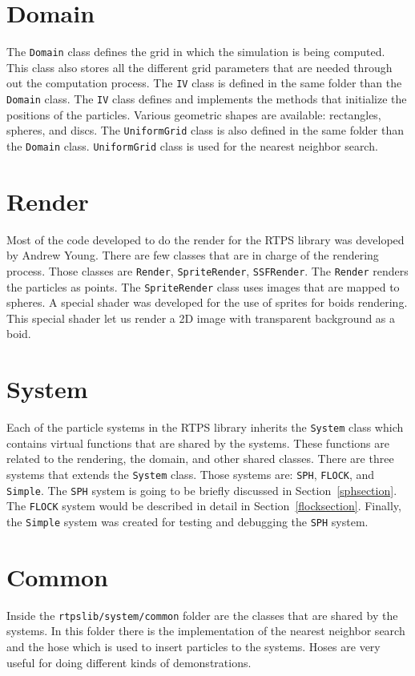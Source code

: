 \section{Domain}
The \texttt{Domain} class defines the grid in which the simulation is being computed. This class also stores all the different grid parameters that are needed through out the computation process. The \texttt{IV} class is defined in the same folder than the \texttt{Domain} class. The \texttt{IV} class defines and implements the methods that initialize the positions of the particles. Various geometric shapes are available: rectangles, spheres, and discs. The \texttt{UniformGrid} class is also defined in the same folder than the \texttt{Domain} class. \texttt{UniformGrid} class is used for the nearest neighbor search.

\section{Render}
Most of the code developed to do the render for the RTPS library was developed by Andrew Young\cite{andrewBlog}. There are few classes that are in charge of the rendering process. Those classes are \texttt{Render}, \texttt{SpriteRender}, \texttt{SSFRender}. The \texttt{Render} renders the particles as points. The \texttt{SpriteRender} class uses images that are mapped to spheres. A special shader was developed for the use of sprites for boids rendering. This special shader let us render a 2D image with transparent background as a boid.

\section{System}
Each of the particle systems in the RTPS library inherits the \texttt{System} class which contains virtual functions that are shared by the systems. These functions are related to the rendering,  the domain, and other shared classes. There are three systems that extends the \texttt{System} class. Those systems are: \texttt{SPH}, \texttt{FLOCK}, and \texttt{Simple}. The \texttt{SPH} system is going to be briefly discussed in Section~\ref{sphsection}. The \texttt{FLOCK} system would be described in detail in Section~\ref{flocksection}. Finally, the \texttt{Simple} system was created for testing and debugging the \texttt{SPH} system.

\section{Common}\label{commonsection}
Inside the \texttt{rtpslib/system/common} folder are the classes that are shared by the systems. In this folder there is the implementation of the nearest neighbor search and the hose which is used to insert particles to the systems. Hoses are very useful for doing different kinds of demonstrations. 

